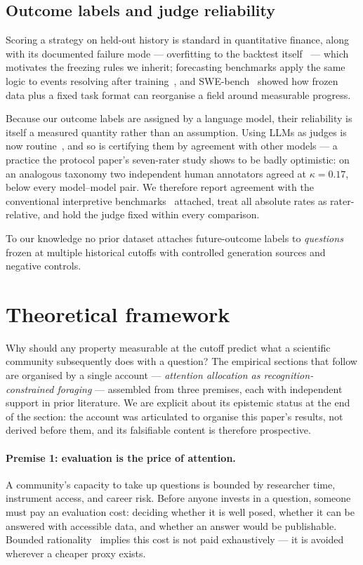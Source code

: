 \documentclass[11pt]{article}
\begin{document}
\subsection{Outcome labels and judge reliability}

Scoring a strategy on held-out history is standard in quantitative finance,
along with its documented failure mode --- overfitting to the backtest
itself~\cite{bailey2014} --- which motivates the freezing rules we inherit;
forecasting benchmarks apply the same logic to events resolving after
training~\cite{zou2022}, and SWE-bench~\cite{jimenez2024} showed how frozen
data plus a fixed task format can reorganise a field around measurable
progress.

Because our outcome labels are assigned by a language model, their
reliability is itself a measured quantity rather than an assumption. Using
LLMs as judges is now routine~\cite{zheng2023}, and so is certifying them by
agreement with other models --- a practice the protocol paper's seven-rater study shows
to be badly optimistic: on an analogous taxonomy two independent human
annotators agreed at $\kappa = 0.17$, below every model--model pair. We
therefore report agreement with the conventional interpretive
benchmarks~\cite{landis1977} attached, treat all absolute rates as
rater-relative, and hold the judge fixed within every comparison.

To our knowledge no prior dataset attaches future-outcome labels to
\emph{questions} frozen at multiple historical cutoffs with controlled
generation sources and negative controls.

\section{Theoretical framework}
\label{sec:theory}

Why should any property measurable at the cutoff predict what a scientific
community subsequently does with a question? The empirical sections that
follow are organised by a single account --- \emph{attention allocation as
recognition-constrained foraging} --- assembled from three premises, each
with independent support in prior literature. We are explicit about its
epistemic status at the end of the section: the account was articulated to
organise this paper's results, not derived before them, and its falsifiable
content is therefore prospective.

\paragraph{Premise 1: evaluation is the price of attention.} A community's
capacity to take up questions is bounded by researcher time, instrument
access, and career risk. Before anyone invests in a question, someone must
pay an evaluation cost: deciding whether it is well posed, whether it can
be answered with accessible data, and whether an answer would be
publishable. Bounded rationality~\cite{simon1955} implies this cost is not
paid exhaustively --- it is avoided wherever a cheaper proxy exists.
\end{document}
